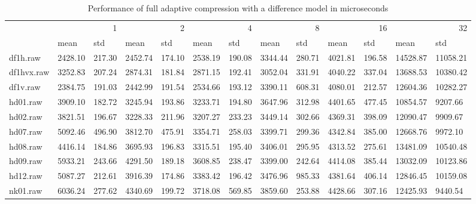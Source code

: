 \begin{table}
\caption{Performance of full adaptive compression with a difference model in microseconds}
\begin{tabular}{lllllllllllll}
 & \multicolumn{2}{r}{1} & \multicolumn{2}{r}{2} & \multicolumn{2}{r}{4} & \multicolumn{2}{r}{8} & \multicolumn{2}{r}{16} & \multicolumn{2}{r}{32} \\
 & mean & std & mean & std & mean & std & mean & std & mean & std & mean & std \\
df1h.raw & 2428.10 & 217.30 & 2452.74 & 174.10 & 2538.19 & 190.08 & 3344.44 & 280.71 & 4021.81 & 196.58 & 14528.87 & 11058.21 \\
df1hvx.raw & 3252.83 & 207.24 & 2874.31 & 181.84 & 2871.15 & 192.41 & 3052.04 & 331.91 & 4040.22 & 337.04 & 13688.53 & 10380.42 \\
df1v.raw & 2384.75 & 191.03 & 2442.99 & 191.54 & 2534.66 & 193.12 & 3390.11 & 608.31 & 4080.01 & 212.57 & 12604.36 & 10282.27 \\
hd01.raw & 3909.10 & 182.72 & 3245.94 & 193.86 & 3233.71 & 194.80 & 3647.96 & 312.98 & 4401.65 & 477.45 & 10854.57 & 9207.66 \\
hd02.raw & 3821.51 & 196.67 & 3228.33 & 211.96 & 3207.27 & 233.23 & 3449.14 & 302.66 & 4369.31 & 398.09 & 12090.47 & 9909.67 \\
hd07.raw & 5092.46 & 496.90 & 3812.70 & 475.91 & 3354.71 & 258.03 & 3399.71 & 299.36 & 4342.84 & 385.00 & 12668.76 & 9972.10 \\
hd08.raw & 4416.14 & 184.86 & 3695.93 & 196.83 & 3315.51 & 195.40 & 3406.01 & 295.95 & 4313.52 & 275.61 & 13481.09 & 10540.48 \\
hd09.raw & 5933.21 & 243.66 & 4291.50 & 189.18 & 3608.85 & 238.47 & 3399.00 & 242.64 & 4414.08 & 385.44 & 13032.09 & 10123.86 \\
hd12.raw & 5087.27 & 212.61 & 3916.39 & 174.86 & 3383.42 & 196.42 & 3476.96 & 985.33 & 4381.64 & 406.14 & 12846.45 & 10159.08 \\
nk01.raw & 6036.24 & 277.62 & 4340.69 & 199.72 & 3718.08 & 569.85 & 3859.60 & 253.88 & 4428.66 & 307.16 & 12425.93 & 9440.54 \\
\end{tabular}
\end{table}

